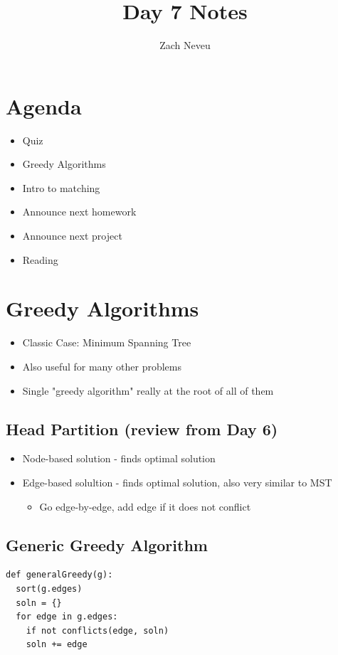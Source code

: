 \documentclass[12pt, letter]{article}
\author{Zach Neveu}
\title{ Day 7 Notes }
\begin{document}
\maketitle

\section{Agenda}%
\label{sec:agenda}
\begin{itemize}
	\item Quiz
	\item Greedy Algorithms
	\item Intro to matching
	\item Announce next homework
	\item Announce next project
	\item Reading
\end{itemize}

\section{Greedy Algorithms}%
\label{sec:greedy_algorithms}
\begin{itemize}
	\item Classic Case: Minimum Spanning Tree
	\item Also useful for many other problems
	\item Single "greedy algorithm" really at the root of all of them
\end{itemize}

\subsection*{Head Partition (review from Day 6)}
\begin{itemize}
	\item Node-based solution - finds optimal solution
	\item Edge-based solultion - finds optimal solution, also very similar to MST
	\begin{itemize}
		\item Go edge-by-edge, add edge if it does not conflict
	\end{itemize}
\end{itemize}

\subsection*{Generic Greedy Algorithm}
\begin{verbatim}
def generalGreedy(g):
  sort(g.edges)
  soln = {}
  for edge in g.edges:
    if not conflicts(edge, soln)
    soln += edge
\end{verbatim}
\end{document}
